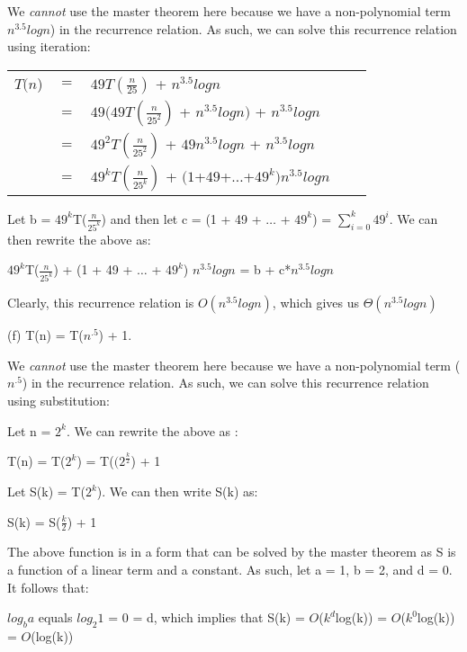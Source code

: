 \documentclass{article}
\begin{document}
We \emph{cannot} use the master theorem here because we have a non-polynomial term $n^{3.5}log n$) in the recurrence relation. As such, we can solve this recurrence relation using iteration:

\begin{center}
	\begin{tabular}{l l l l l}
		$T(n$) &$=$ &$49T(\frac{n}{25})$ + $n^{3.5}log n$ \\
	  		   &$=$ &$49(49T(\frac{n}{25^2})$ +  $n^{3.5}log n)$ + $n^{3.5}log n$ \\
	  		   &$=$ &$49^2T(\frac{n}{25^2})$ + $49n^{3.5}log n$ + $n^{3.5}log n$ \\
	  		   &$=$ &$49^kT(\frac{n}{25^k})$ + $(1 $+$ 49 $+$ \dots $+$ 49^k) n^{3.5}log n$ \\
 	\end{tabular}
\end{center}

Let b = $49^k$T($\frac{n}{25^k}$) and then let c = (1 + 49 + $\dots$ + $49^k$) = $\sum_{i=0}^{k‎} 49^i ‎‎$. We can then rewrite the above as: 

\begin{center}
$49^k$T($\frac{n}{25^k}$) + (1 + 49 + $\dots$ + $49^k$) $n^{3.5}log n$ = b + c*$n^{3.5}log n$
\end{center}

Clearly, this recurrence relation is $O(n^{3.5}log n)$, which gives us $\Theta(n^{3.5}log n)$


(f) T(n) = T($n^{.5}$) + 1.

We \emph{cannot} use the master theorem here because we have a non-polynomial term ($n^{.5}$) in the recurrence relation. As such, we can solve this recurrence relation using substitution:

Let n = $2^k$. We can rewrite the above as :

\begin{center}
T(n) = T($2^k$) =  T($(2^\frac{k}{2}$) + 1
\end{center}

Let S(k) = T($2^k$). We can then write S(k) as: 

\begin{center}
S(k) = S($\frac{k}{2}$) + 1
\end{center}

The above function is in a form that can be solved by the master theorem as S is a function of a linear term and a constant. As such, let a = 1, b = 2, and d = 0. It follows that:

\begin{center}
$log_b a$ equals $log_2 1$ = 0 = d, which implies that S(k) = $O$($k^d$log(k)) = $O$($k^0$log(k)) = $O$(log(k))
\end{center} 
\end{document}

